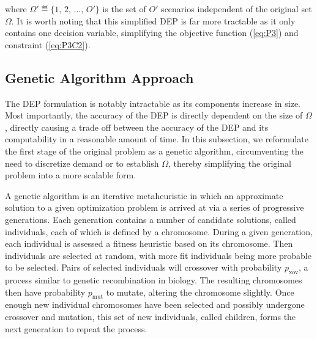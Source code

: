 \documentclass[onecolumn,draftcls]{IEEEtran}
\begin{document}
\iffalse
\vspace{5mm}
\noindent \textbf{Problem 3 (One-Stage Simplified DEP)}

\begin{equation} \label{eq:P3}
\underset{\left\{ \substack{
	\delta_{ms}^{\{\omega\}},\,	s \in \mathcal{S},\\
	m \in \mathcal{M},\, \omega \in \Omega'} \right\}} {\text{minimize}}
- \sum_{\omega \in \Omega'} p^{\{\omega\}} \left( \sum_{m \in \mathcal{M}} \sum_{s \in \mathcal{S}} \delta_{ms}^{\{\omega\}} u_{ms}^{\{\omega\}} \right)
\end{equation}
subject to:
\begin{equation} \label{eq:P3C1}
\sum_{s \in \mathcal{S}} u_{ms}^{\{\omega\}} \delta_{ms}^{\{\omega\}} \leq d_m,\, \forall m \in \mathcal{M},\, \forall \omega \in \Omega'
\end{equation}
\begin{equation} \label{eq:P3C2}
\sum_{m \in \mathcal{M}} \delta_{ms}^{\{\omega\}} \leq r_s z_s,\, \forall s \in \mathcal{S},\, \forall \omega \in \Omega'
\end{equation}
\fi

\noindent where $\Omega' \eqdef \{1,\, 2,\, \ldots,\, O'\}$ is the set of $O'$ scenarios independent of the original set $\Omega$.  It is worth noting that this simplified DEP is far more tractable as it only contains one decision variable, simplifying the objective function (\ref{eq:P3}) and constraint (\ref{eq:P3C2}).

\subsection{Genetic Algorithm Approach} \label{subsec:ga}
The DEP formulation is notably intractable as its components increase in size.  Most importantly, the accuracy of the DEP is directly dependent on the size of $\Omega$, directly causing a trade off between the accuracy of the DEP and its computability in a reasonable amount of time.  In this subsection, we reformulate the first stage of the original problem as a genetic algorithm, circumventing the need to discretize demand or to establish $\Omega$, thereby simplifying the original problem into a more scalable form.

A genetic algorithm is an iterative metaheuristic in which an approximate solution to a given optimization problem is arrived at via a series of progressive generations.  Each generation contains a number of candidate solutions, called individuals, each of which is defined by a chromosome.  During a given generation, each individual is assessed a fitness heuristic based on its chromosome.  Then individuals are selected at random, with more fit individuals being more probable to be selected.  Pairs of selected individuals will crossover with probability $p_\text{xov}$, a process similar to genetic recombination in biology.  The resulting chromosomes then have probability $p_\text{mut}$ to mutate, altering the chromosome slightly.  Once enough new individual chromosomes have been selected and possibly undergone crossover and mutation, this set of new individuals, called children, forms the next generation to repeat the process.  %
\end{document}
